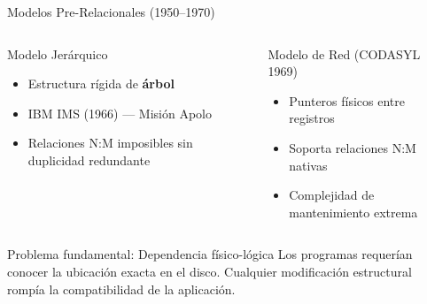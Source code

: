 \documentclass[12pt, aspectratio=169, UTF8]{beamer}
\begin{document}
\begin{frame}{Modelos Pre-Relacionales (1950–1970)}
  \begin{columns}[T]
      \begin{block}{Modelo Jerárquico}
        \begin{itemize}
          \item Estructura rígida de \textbf{árbol}
          \item IBM IMS (1966) — Misión Apolo
          \item Relaciones N:M imposibles sin duplicidad redundante
        \end{itemize}
      \end{block}
      \begin{block}{Modelo de Red (CODASYL 1969)}
        \begin{itemize}
          \item Punteros físicos entre registros
          \item Soporta relaciones N:M nativas
          \item Complejidad de mantenimiento extrema
        \end{itemize}
      \end{block}
  \end{columns}
  \vspace{6pt}
  \begin{alertblock}{Problema fundamental: Dependencia físico-lógica}
    Los programas requerían conocer la ubicación exacta en el disco. Cualquier modificación estructural rompía la compatibilidad de la aplicación.
  \end{alertblock}
\end{frame}
\end{document}
